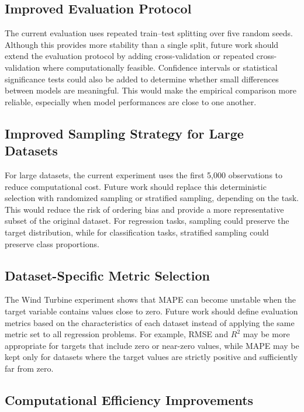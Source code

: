 \subsection{Improved Evaluation Protocol}

\hs The current evaluation uses repeated train--test splitting over five random seeds. Although this provides more stability than a single split, future work should extend the evaluation protocol by adding cross-validation or repeated cross-validation where computationally feasible. Confidence intervals or statistical significance tests could also be added to determine whether small differences between models are meaningful. This would make the empirical comparison more reliable, especially when model performances are close to one another.

\subsection{Improved Sampling Strategy for Large Datasets}

\hs For large datasets, the current experiment uses the first 5,000 observations to reduce computational cost. Future work should replace this deterministic selection with randomized sampling or stratified sampling, depending on the task. This would reduce the risk of ordering bias and provide a more representative subset of the original dataset. For regression tasks, sampling could preserve the target distribution, while for classification tasks, stratified sampling could preserve class proportions.

\subsection{Dataset-Specific Metric Selection}

\hs The Wind Turbine experiment shows that MAPE can become unstable when the target variable contains values close to zero. Future work should define evaluation metrics based on the characteristics of each dataset instead of applying the same metric set to all regression problems. For example, RMSE and $R^2$ may be more appropriate for targets that include zero or near-zero values, while MAPE may be kept only for datasets where the target values are strictly positive and sufficiently far from zero.

\subsection{Computational Efficiency Improvements}

